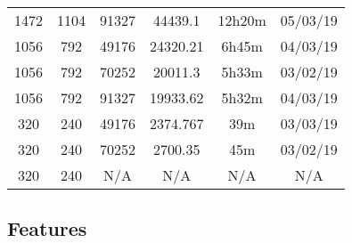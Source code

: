 \begin{center}
\begin{tabular}{ c c c | c c c }
  1472 & 1104 & 91327 & 44439.1 & 12h20m & 05/03/19 \\
  1056 & 792 & 49176 & 24320.21 & 6h45m & 04/03/19 \\
  1056 & 792 & 70252 & 20011.3 & 5h33m & 03/02/19 \\
  1056 & 792 & 91327 & 19933.62 & 5h32m & 04/03/19 \\
  320 & 240 & 49176 & 2374.767 & 39m & 03/03/19 \\
  320 & 240 & 70252 & 2700.35 & 45m & 03/02/19 \\
  320 & 240 & N/A & N/A & N/A & N/A \\
  \end{tabular}
  \end{center}
  
\newpage
\subsection{Features}
